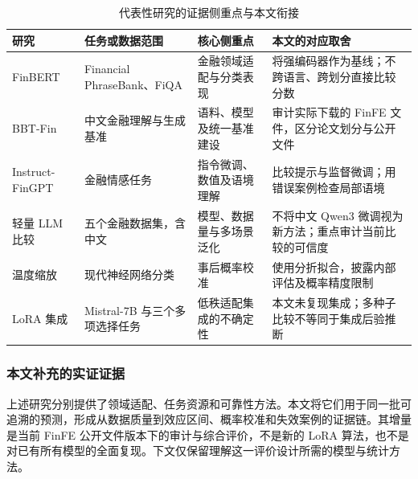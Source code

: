 \begin{table}[htbp]
\centering
\begin{minipage}{\textwidth}
\setlength{\tabcolsep}{3pt}
\renewcommand{\arraystretch}{1.16}
\fontsize{10.5}{13.5}\selectfont
\caption{代表性研究的证据侧重点与本文衔接}\label{tab:2-1}
\begin{tabular}{>{\raggedright\arraybackslash}p{}>{\raggedright\arraybackslash}p{}>{\raggedright\arraybackslash}p{}>{\raggedright\arraybackslash}p{}}
\toprule
\textbf{研究} & \textbf{任务或数据范围} & \textbf{核心侧重点} & \textbf{本文的对应取舍} \\
\midrule
FinBERT\cite{ref8} & Financial PhraseBank、FiQA & 金融领域适配与分类表现 & 将强编码器作为基线；不跨语言、跨划分直接比较分数 \\
BBT-\allowbreak{}Fin\cite{ref19} & 中文金融理解与生成基准 & 语料、模型及统一基准建设 & 审计实际下载的 FinFE 文件，区分论文划分与公开文件 \\
Instruct-\allowbreak{}FinGPT\cite{ref16} & 金融情感任务 & 指令微调、数值及语境理解 & 比较提示与监督微调；用错误案例检查局部语境 \\
轻量 LLM 比较\cite{ref18} & 五个金融数据集，含中文 & 模型、数据量与多场景泛化 & 不将中文 Qwen3 微调视为新方法；重点审计当前比较的可信度 \\
温度缩放\cite{ref22} & 现代神经网络分类 & 事后概率校准 & 使用分折拟合，披露内部评估及概率精度限制 \\
LoRA 集成\cite{ref24} & Mistral-\allowbreak{}7B 与三个多项选择任务 & 低秩适配集成的不确定性 & 本文未复现集成；多种子比较不等同于集成后验推断 \\
\bottomrule\end{tabular}
\par{}
\end{minipage}
\end{table}

\subsubsection{本文补充的实证证据}

上述研究分别提供了领域适配、任务资源和可靠性方法。本文将它们用于同一批可追溯的预测，形成从数据质量到效应区间、概率校准和失效案例的证据链。其增量是当前 FinFE 公开文件版本下的审计与综合评价，不是新的 LoRA 算法，也不是对已有所有模型的全面复现。下文仅保留理解这一评价设计所需的模型与统计方法。

